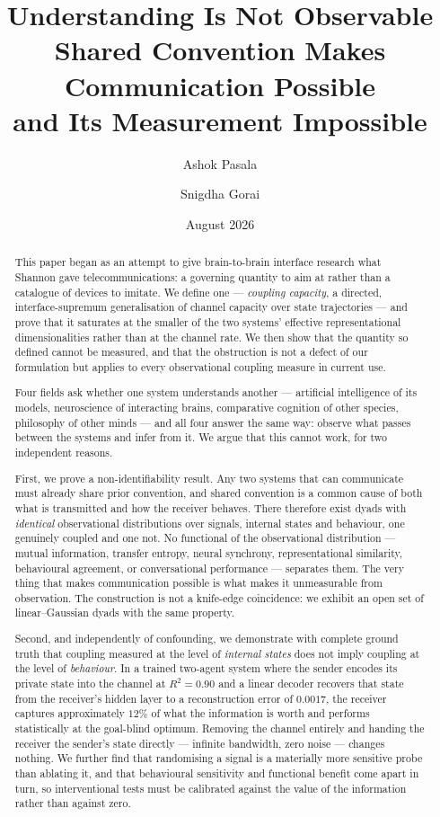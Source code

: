 \documentclass[11pt,a4paper]{article}
\title{\vspace{-1.2cm}\bfseries\Large Understanding Is Not Observable\\[6pt]
\large\mdseries Shared Convention Makes Communication Possible\\and Its Measurement Impossible}
\author[]{Ashok Pasala}
\author[]{Snigdha Gorai}
\affil[]{\normalsize VIT-AP University, Amaravati, Andhra Pradesh, India}
\affil[]{\small Correspondence: \href{mailto:ashokashishms@gmail.com}{\texttt{ashokashishms@gmail.com}}}
\date{August 2026}
\theoremstyle{plain}
\theoremstyle{definition}
\theoremstyle{remark}
\begin{document}
\maketitle
\thispagestyle{plain}

\begin{abstract}
\noindent
This paper began as an attempt to give brain-to-brain interface research what Shannon gave
telecommunications: a governing quantity to aim at rather than a catalogue of devices to
imitate. We define one --- \emph{coupling capacity}, a directed, interface-supremum
generalisation of channel capacity over state trajectories --- and prove that it saturates at
the smaller of the two systems' effective representational dimensionalities rather than at the
channel rate. We then show that the quantity so defined cannot be measured, and that the
obstruction is not a defect of our formulation but applies to every observational coupling
measure in current use.

Four fields ask whether one system understands another --- artificial intelligence of its
models, neuroscience of interacting brains, comparative cognition of other species,
philosophy of other minds --- and all four answer the same way: observe what passes
between the systems and infer from it. We argue that this cannot work, for two
independent reasons.

First, we prove a non-identifiability result. Any two systems that can communicate must
already share prior convention, and shared convention is a common cause of both what is
transmitted and how the receiver behaves. There therefore exist dyads with \emph{identical}
observational distributions over signals, internal states and behaviour, one genuinely
coupled and one not. No functional of the observational distribution --- mutual
information, transfer entropy, neural synchrony, representational similarity, behavioural
agreement, or conversational performance --- separates them. The very thing that makes
communication possible is what makes it unmeasurable from observation. The construction is
not a knife-edge coincidence: we exhibit an open set of linear--Gaussian dyads with the
same property.

Second, and independently of confounding, we demonstrate with complete ground truth that
coupling measured at the level of \emph{internal states} does not imply coupling at the
level of \emph{behaviour}. In a trained two-agent system where the sender encodes its
private state into the channel at $R^2 = 0.90$ and a linear decoder recovers that state
from the receiver's hidden layer to a reconstruction error of $0.0017$, the receiver
captures approximately $12\%$ of what the information is worth and performs statistically
at the goal-blind optimum. Removing the channel entirely and handing the receiver the
sender's state directly --- infinite bandwidth, zero noise --- changes nothing. We further
find that randomising a signal is a materially more sensitive probe than ablating it, and
that behavioural sensitivity and functional benefit come apart in turn, so interventional
tests must be calibrated against the value of the information rather than against zero.


\end{abstract}
\end{document}
